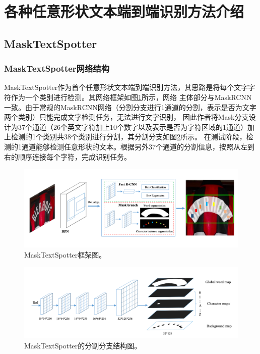 \section{各种任意形状文本端到端识别方法介绍}
\subsection{MaskTextSpotter}
\subsubsection{MaskTextSpotter网络结构}
MaskTextSpotter作为首个任意形状文本端到端识别方法，其思路是将每个文字字符作为一个类别进行检测。其网络框架如图\ref{masktextspotter_framework}所示，网络
主体部分与MaskRCNN\cite{he2017mask}一致。由于常规的MaskRCNN网络（分割分支进行1通道的分割，表示是否为文字两个类别）只能完成文字检测任务，无法进行文字识别，
因此作者将Mask分支设计为37个通道（26个英文字符加上10个数字以及表示是否为字符区域的1通道）加上检测的1个类别共38个类别进行分割，其分割分支如图\ref{masktextspotter_maskbranch}所示。
在测试阶段，检测的1通道能够检测任意形状的文本。根据另外37个通道的分割信息，按照从左到右的顺序连接每个字符，完成识别任务。

\begin{figure}[htb]
    \centering
    \includegraphics[width=.98\textwidth]{figure/spotting/masktextspotter_framework.png} 
    \caption{MaskTextSpotter框架图。} 
    \label{masktextspotter_framework} 
\end{figure}

\begin{figure}[htb]
    \centering
    \includegraphics[width=.98\textwidth]{figure/spotting/masktextspotter_maskbranch.png} 
    \caption{MaskTextSpotter的分割分支结构图。} 
    \label{masktextspotter_maskbranch} 
\end{figure}

